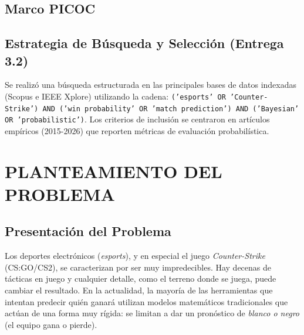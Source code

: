 \documentclass[twocolumn,10pt]{article}
\begin{document}
\subsection{Marco PICOC}
\begin{table}[H]
\centering
{}
\caption{Delimitación PICOC de la investigación.}
\label{tab:picoc}
\end{table}

\subsection{Estrategia de Búsqueda y Selección (Entrega 3.2)}
Se realizó una búsqueda estructurada en las principales bases de datos indexadas (Scopus e IEEE Xplore) utilizando la cadena: \texttt{('esports' OR 'Counter-Strike') AND ('win probability' OR 'match prediction') AND ('Bayesian' OR 'probabilistic')}. Los criterios de inclusión se centraron en artículos empíricos (2015-2026) que reporten métricas de evaluación probabilística.

\section{PLANTEAMIENTO DEL PROBLEMA}

\subsection{Presentación del Problema}

Los deportes electrónicos (\textit{esports}), y en especial el juego \textit{Counter-Strike} (CS:GO/CS2), se caracterizan por ser muy impredecibles. Hay decenas de tácticas en juego y cualquier detalle, como el terreno donde se juega, puede cambiar el resultado. En la actualidad, la mayoría de las herramientas que intentan predecir quién ganará utilizan modelos matemáticos tradicionales que actúan de una forma muy rígida: se limitan a dar un pronóstico de \textit{blanco o negro} (el equipo gana o pierde).
\end{document}
